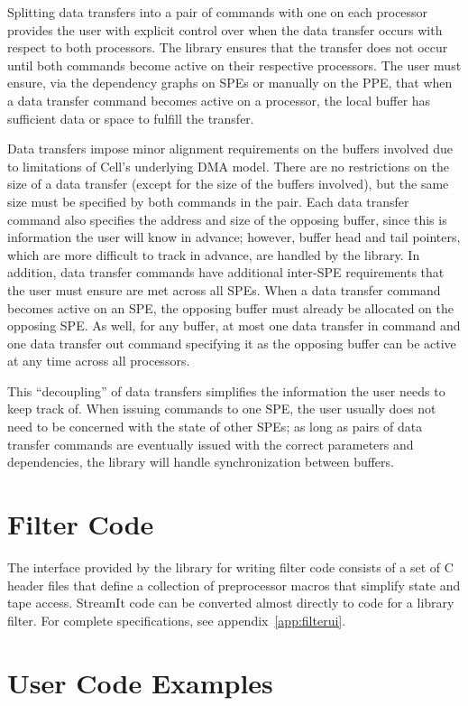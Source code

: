 Splitting data transfers into a pair of commands with one on each processor provides the user with explicit control over when the data transfer occurs with respect to both processors. The library ensures that the transfer does not occur until both commands become active on their respective processors. The user must ensure, via the dependency graphs on SPEs or manually on the PPE, that when a data transfer command becomes active on a processor, the local buffer has sufficient data or space to fulfill the transfer.

Data transfers impose minor alignment requirements on the buffers involved due to limitations of Cell's underlying DMA model. There are no restrictions on the size of a data transfer (except for the size of the buffers involved), but the same size must be specified by both commands in the pair. Each data transfer command also specifies the address and size of the opposing buffer, since this is information the user will know in advance; however, buffer head and tail pointers, which are more difficult to track in advance, are handled by the library. In addition, data transfer commands have additional inter-SPE requirements that the user must ensure are met across all SPEs. When a data transfer command becomes active on an SPE, the opposing buffer must already be allocated on the opposing SPE. As well, for any buffer, at most one data transfer in command and one data transfer out command specifying it as the opposing buffer can be active at any time across all processors.

This ``decoupling'' of data transfers simplifies the information the user needs to keep track of. When issuing commands to one SPE, the user usually does not need to be concerned with the state of other SPEs; as long as pairs of data transfer commands are eventually issued with the correct parameters and dependencies, the library will handle synchronization between buffers.

\section{Filter Code}

The interface provided by the library for writing filter code consists of a set of C header files that define a collection of preprocessor macros that simplify state and tape access. StreamIt code can be converted almost directly to code for a library filter. For complete specifications, see appendix~\ref{app:filterui}.

\section{User Code Examples}

